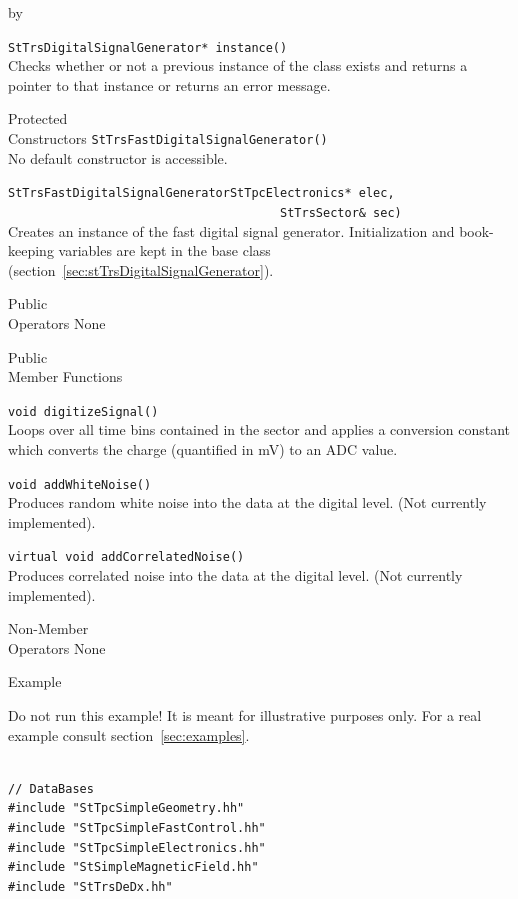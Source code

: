 \documentclass[twoside]{article}
\newcommand{\entrylabel}[1]{\mbox{\textbf{{#1}}}\hfil}%
\newenvironment{entry}
{\begin{list}{}%
    {\renewcommand{\makelabel}{\entrylabel}%
     \setlength{\labelwidth}{90pt}%
     \setlength{\leftmargin}{\labelwidth}
     \advance\leftmargin by \labelsep%
      }%
    }%
  {\end{list}}
\newcommand{\Entrylabel}[1]%
{\raisebox{0pt}[1ex][0pt]{\makebox[\labelwidth][l]%
    {\parbox[t]{\labelwidth}{\hspace{0pt}\textbf{{#1}}}}}}
\newenvironment{Entry}%
{\renewcommand{\entrylabel}{\Entrylabel}\begin{entry}}%
  {\end{entry}}
\begin{document}
\begin{Entry}
   \verb+StTrsDigitalSignalGenerator* instance()+\\
   Checks whether or not a previous instance of the class exists and
   returns a pointer to that instance or returns an error message.

\item[Protected \\ Constructors]
   \verb+StTrsFastDigitalSignalGenerator()+\\
   No default constructor is accessible.

   \verb+StTrsFastDigitalSignalGeneratorStTpcElectronics* elec,+\\
   \verb+                                      StTrsSector& sec)+\\
   Creates an instance of the fast digital signal generator.  Initialization 
   and book-keeping variables are kept in the base class 
   (section~\ref{sec:stTrsDigitalSignalGenerator}).

\item[Public \\ Operators]
   None

\item[Public \\ Member Functions]

  \verb+void digitizeSignal()+\\
  Loops over all time bins contained in the sector and applies
  a conversion constant which converts the charge (quantified in mV)
  to an ADC value.

  \verb+void addWhiteNoise()+\\
  Produces random white noise into the data
  at the digital level. (Not currently implemented).

  \verb+virtual void addCorrelatedNoise()+\\
  Produces correlated noise into the data
  at the digital level.  (Not currently implemented).

\item[Non-Member \\ Operators]
  None

\item[Example]

Do not run this example!  It is meant for illustrative purposes only.
For a real example consult section~\ref{sec:examples}.

{\footnotesize
\begin{verbatim}

// DataBases
#include "StTpcSimpleGeometry.hh"
#include "StTpcSimpleFastControl.hh"
#include "StTpcSimpleElectronics.hh"
#include "StSimpleMagneticField.hh"
#include "StTrsDeDx.hh"


\end{verbatim}}
\end{Entry}
\end{document}
